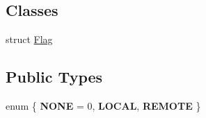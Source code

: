 \subsection*{\-Classes}
\begin{DoxyCompactItemize}
\item 
struct \hyperlink{structNeb_1_1Scene_1_1scene_1_1Flag}{\-Flag}
\end{DoxyCompactItemize}
\subsection*{\-Public \-Types}
\begin{DoxyCompactItemize}
\item 
enum \{ {\bfseries \-N\-O\-N\-E} =  0, 
{\bfseries \-L\-O\-C\-A\-L}, 
{\bfseries \-R\-E\-M\-O\-T\-E}
 \}
\end{DoxyCompactItemize}
